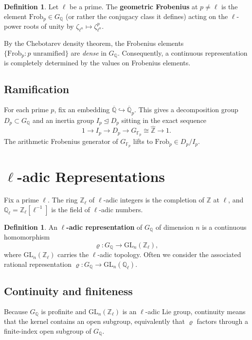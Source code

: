 \documentclass[a4paper,12pt]{amsart}
\theoremstyle{definition}
\newtheorem{definition}[theorem]{Definition}
\theoremstyle{remark}
\newcommand{\Q}{\mathbb{Q}}
\newcommand{\Z}{\mathbb{Z}}
\newcommand{\Zl}{\mathbb{Z}_\ell}
\newcommand{\Ql}{\mathbb{Q}_\ell}
\newcommand{\Fp}{\mathbb{F}_p}
\newcommand{\Qbar}{\overline{\mathbb{Q}}}
\newcommand{\GL}{\mathrm{GL}}
\newcommand{\Frob}{\mathrm{Frob}}
\begin{document}
\begin{definition}
Let $\ell$ be a prime. The \textbf{geometric Frobenius} at $p \neq \ell$ is the
element $\Frob_p \in G_\Q$ (or rather the conjugacy class it defines) acting on the
$\ell$-power roots of unity by $\zeta_{\ell^n} \mapsto \zeta_{\ell^n}^p$.
\end{definition}

By the Chebotarev density theorem, the Frobenius elements $\{\Frob_p : p \text{ unramified}\}$
are \emph{dense} in $G_\Q$. Consequently, a continuous representation is completely
determined by the values on Frobenius elements.

\subsection{Ramification}

For each prime $p$, fix an embedding $\Qbar \hookrightarrow \overline{\Q}_p$.
This gives a decomposition group $D_p \subset G_\Q$ and an inertia group $I_p \trianglelefteq D_p$
sitting in the exact sequence
\[
  1 \to I_p \to D_p \to G_{\Fp} \cong \hat{\Z} \to 1.
\]
The arithmetic Frobenius generator of $G_{\Fp}$ lifts to $\Frob_p \in D_p/I_p$.

\section{\texorpdfstring{$\ell$}{l}-adic Representations}
\label{sec:ell-adic}

Fix a prime $\ell$. The ring $\Zl$ of $\ell$-adic integers is the completion of $\Z$
at $\ell$, and $\Ql = \Zl[\ell^{-1}]$ is the field of $\ell$-adic numbers.

\begin{definition}
An \textbf{$\ell$-adic representation} of $G_\Q$ of dimension $n$ is a continuous
homomorphism
\[
  \varrho\colon G_\Q \to \GL_n(\Zl),
\]
where $\GL_n(\Zl)$ carries the $\ell$-adic topology. Often we consider the
associated rational representation $\varrho\colon G_\Q \to \GL_n(\Ql)$.
\end{definition}

\subsection{Continuity and finiteness}

Because $G_\Q$ is profinite and $\GL_n(\Zl)$ is an $\ell$-adic Lie group, continuity
means that the kernel contains an open subgroup, equivalently that $\varrho$ factors
through a finite-index open subgroup of $G_\Q$.
\end{document}
